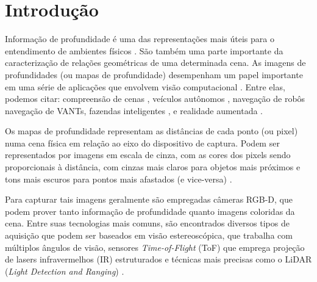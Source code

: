 
\chapter{Introdução}

Informação de profundidade é uma das representações mais úteis para o entendimento de ambientes físicos \cite{lasinger2019towards} \cite{zhou2019does}. São também uma parte importante da caracterização de relações geométricas de uma determinada cena. As imagens de profundidades (ou mapas de profundidade) desempenham um papel importante em uma série de aplicações que envolvem visão computacional \cite{eigen2014depth}.  Entre elas, podemos citar: compreensão de cenas \cite{jaritz2018sparse}, veículos autônomos \cite{song2021self}, navegação de robôs \cite{ma2019sparse} navegação de VANTs, \cite{padhy2023monocular} fazendas inteligentes \cite{farkhani2019sparse}, e realidade aumentada \cite{du2020depthlab}. 


Os mapas de profundidade representam as distâncias de cada ponto (ou pixel) numa cena física em relação ao eixo do dispositivo de captura. Podem ser representados por imagens em escala de cinza, com as cores dos pixels sendo proporcionais à distância, com cinzas mais claros para objetos mais próximos e tons mais escuros para pontos mais afastados (e vice-versa) \cite{dourado2020multi}.



Para capturar tais imagens geralmente são empregadas câmeras RGB-D, que podem prover tanto informação de profundidade quanto imagens coloridas da cena. Entre suas tecnologias mais comuns, são encontrados diversos tipos de aquisição que podem ser baseados em visão estereoscópica, que trabalha com múltiplos ângulos de visão, sensores \textit{Time-of-Flight} (ToF) que emprega projeção de lasers infravermelhos (IR) estruturados e técnicas mais precisas como o LiDAR (\textit{Light Detection and Ranging}) \cite{castellano2023performance}.


